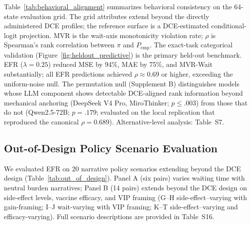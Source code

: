 \documentclass[12pt]{article}
\begin{document}
Table~\ref{tab:behavioral_alignment} summarizes behavioral consistency on the 64-state evaluation grid. The grid attributes extend beyond the directly administered DCE profiles; the reference surface is a DCE-estimated conditional-logit projection. MVR is the wait-axis monotonicity violation rate; $\rho$ is Spearman's rank correlation between $\pi$ and $P_{\text{emp}}$. The exact-task categorical validation (Figure~\ref{fig:heldout_predictive}) is the primary held-out benchmark. EFR ($\lambda = 0.25$) reduced MSE by 94\%, MAE by 75\%, and MVR-Wait substantially; all EFR predictions achieved $\rho \approx 0.69$ or higher, exceeding the uniform-noise null. The permutation null (Supplement B) distinguishes models whose LLM component shows detectable DCE-aligned rank information beyond mechanical anchoring (DeepSeek V4 Pro, MiroThinker; $p \leq .003$) from those that do not (Qwen2.5-72B; $p = .179$; evaluated on the local replication that reproduced the canonical $\rho = 0.689$). Alternative-level analysis: Table~S7.

\clearpage
\subsection{Out-of-Design Policy Scenario Evaluation}
\label{sec:out_of_design}

We evaluated EFR on 20 narrative policy scenarios extending beyond the DCE design (Table~\ref{tab:out_of_design}). Panel A (six pairs) varies waiting time with neutral burden narratives; Panel B (14 pairs) extends beyond the DCE design on side-effect levels, vaccine efficacy, and VIP framing (G--H side-effect--varying with gain-framing; I--J wait-varying with VIP framing; K--T side-effect--varying and efficacy-varying). Full scenario descriptions are provided in Table~S16.
\end{document}
